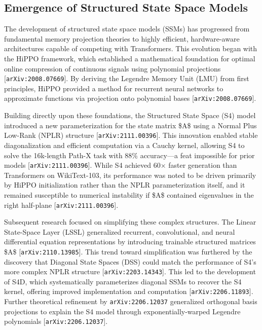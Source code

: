 \documentclass[11pt]{article}
\begin{document}
\subsection{Emergence of Structured State Space Models}

The development of structured state space models (SSMs) has progressed from fundamental memory projection theories to highly efficient, hardware-aware architectures capable of competing with Transformers. This evolution began with the HiPPO framework, which established a mathematical foundation for optimal online compression of continuous signals using polynomial projections [\texttt{arXiv:2008.07669}]. By deriving the Legendre Memory Unit (LMU) from first principles, HiPPO provided a method for recurrent neural networks to approximate functions via projection onto polynomial bases [\texttt{arXiv:2008.07669}].

Building directly upon these foundations, the Structured State Space (S4) model introduced a new parameterization for the state matrix \$A\$ using a Normal Plus Low-Rank (NPLR) structure [\texttt{arXiv:2111.00396}]. This innovation enabled stable diagonalization and efficient computation via a Cauchy kernel, allowing S4 to solve the 16k-length Path-X task with 88\% accuracy—a feat impossible for prior models [\texttt{arXiv:2111.00396}]. While S4 achieved 60× faster generation than Transformers on WikiText-103, its performance was noted to be driven primarily by HiPPO initialization rather than the NPLR parameterization itself, and it remained susceptible to numerical instability if \$A\$ contained eigenvalues in the right half-plane [\texttt{arXiv:2111.00396}].

Subsequent research focused on simplifying these complex structures. The Linear State-Space Layer (LSSL) generalized recurrent, convolutional, and neural differential equation representations by introducing trainable structured matrices \$A\$ [\texttt{arXiv:2110.13985}]. This trend toward simplification was furthered by the discovery that Diagonal State Spaces (DSS) could match the performance of S4's more complex NPLR structure [\texttt{arXiv:2203.14343}]. This led to the development of S4D, which systematically parameterizes diagonal SSMs to recover the S4 kernel, offering improved implementation and computation [\texttt{arXiv:2206.11893}]. Further theoretical refinement by \texttt{arXiv:2206.12037} generalized orthogonal basis projections to explain the S4 model through exponentially-warped Legendre polynomials [\texttt{arXiv:2206.12037}].
\end{document}
